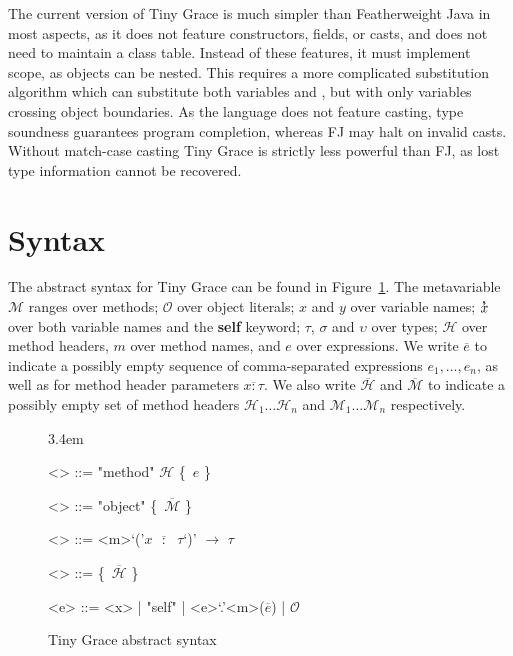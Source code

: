 \documentclass[a4paper, 11pt]{article}
\def\H{\mathcal{H}}
\def\M{\mathcal{M}}
\def\O{\mathcal{O}}
\def\bo{{\sffamily\{}}
\def\bc{{\sffamily\}}}
\newcommand{\self}{\text{\sffamily\bfseries self}}
\def\xs{\overset{_\text{\sffamily\bfseries s}}x}
\theoremstyle{theorem}
\theoremstyle{lemma}
\theoremstyle{tproof}
\theoremstyle{lproof}
\theoremstyle{tcase}
\theoremstyle{lcase}
\begin{document}
\noindent The current version of Tiny Grace is much simpler than Featherweight
Java in most aspects, as it does not feature constructors, fields, or casts, and
does not need to maintain a class table.  Instead of these features, it must
implement scope, as objects can be nested.  This requires a more complicated
substitution algorithm which can substitute both variables and \self, but with
only variables crossing object boundaries.  As the language does not feature
casting, type soundness guarantees program completion, whereas FJ may halt on
invalid casts.  Without match-case casting Tiny Grace is strictly less powerful
than FJ, as lost type information cannot be recovered.


\section{Syntax}

\def\*#1*{$\overline{#1}$}

The abstract syntax for Tiny Grace can be found in
Figure~\ref{fig:abstract-syntax}.  The metavariable $\M$ ranges over methods;
$\O$ over object literals; $x$ and $y$ over variable names; $\xs$ over both
variable names and the {\sffamily\bfseries self} keyword; $\tau$, $\sigma$ and
$\upsilon$ over types; $\H$ over method headers, $m$ over method names, and $e$
over expressions.  We write \*e* to indicate a possibly empty sequence of
comma-separated expressions $e_1, \dots, e_n$, as well as for method header
parameters \*x : \tau*.  We also write \*\H* and \*\M* to indicate a possibly
empty set of method headers $\H_1 \dots \H_n$ and $\M_1 \dots \M_n$
respectively.

\begin{figure}
\centering

\def\*#1*{$\overline{\text{#1}}$}
\def\<#1>{$#1$}

\grammarindent3.4em
\renewcommand{\grammarlabel}[2]{$#1$\hfill#2}
\renewcommand{\syntleft}{\itshape}
\renewcommand{\syntright}{}
\renewcommand{\ulitleft}{\sffamily\bfseries}
\renewcommand{\litleft}{\sffamily}
\renewcommand{\litright}{}

\begin{grammar}
<\M> ::= "method" $\H$ \bo~\<e> \bc

<\O> ::= "object" \bo~\*$\M$* \bc

<\H> ::= <m>`('\*\<x> $:$ $\tau$*`)' $\to$ $\tau$

<\tau> ::= \bo~\*$\H$* \bc

<e> ::= <x> | "self" | <e>`.'<m>(\*\<e>*) | $\O$
\end{grammar}

\caption{Tiny Grace abstract syntax}
\label{fig:abstract-syntax}

\end{figure}
\end{document}
